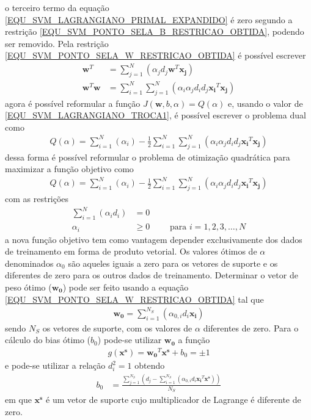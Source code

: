 o terceiro termo da equação \eqref{EQU_SVM_LAGRANGIANO_PRIMAL_EXPANDIDO} é zero segundo a restrição \eqref{EQU_SVM_PONTO_SELA_B_RESTRICAO_OBTIDA}, podendo ser removido. Pela restrição \eqref{EQU_SVM_PONTO_SELA_W_RESTRICAO_OBTIDA} é possível escrever
\begin{align}
\mathbf{w}^{T} &= \sum\limits_{j = 1}^{N} \left( \alpha_{j}d_{j}\mathbf{w}^{T}\mathbf{x_{j}} \right) \\
\mathbf{w}^{T}\mathbf{w} &= \sum\limits_{i=1}^{N} \sum\limits_{j=1}^{N} \left( \alpha_{i}\alpha_{j}d_{i}d_{j}\mathbf{x_{i}}^{T}\mathbf{x_{j}} \right) \label{EQU_SVM_LAGRANGIANO_TROCA1}
\end{align}
agora é possível reformular a função \(J(\mathbf{w}, b, \alpha) = Q(\alpha)\) e, usando o valor de \eqref{EQU_SVM_LAGRANGIANO_TROCA1}, é possível escrever o problema dual como
\begin{align}
Q(\alpha) = \sum\limits_{i=1}^{N} \left( \alpha_{i} \right) - \frac{1}{2} \sum\limits_{i=1}^{N} \sum\limits_{j=1}^{N} \left( \alpha_{i}\alpha_{j}d_{i}d_{j}\mathbf{x_{i}}^{T}\mathbf{x_{j}} \right) \label{EQU_SVM_LAGRANGIANO_DUAL}
\end{align}
dessa forma é possível reformular o problema de otimização quadrática para maximizar a função objetivo como
\begin{align}
Q(\alpha) = \sum\limits_{i=1}^{N} \left( \alpha_{i} \right) - \frac{1}{2} \sum\limits_{i=1}^{N} \sum\limits_{j=1}^{N} \left( \alpha_{i}\alpha_{j}d_{i}d_{j}\mathbf{x_{i}}^{T}\mathbf{x_{j}} \right) \label{EQU_SVM_OBJETIVO_DUAL}
\end{align}
com as restrições
\begin{align}
\sum\limits_{i=1}^{N} \left( \alpha_{i}d_{i} \right) &= 0 \\
\alpha_{i} &\geq 0	\qquad \textrm{ para } i = 1, 2, 3, \ldots, N
\end{align}
a nova função objetivo tem como vantagem depender exclusivamente dos dados de treinamento em forma de produto vetorial. Os valores ótimos de \(\alpha\) denominados \(\alpha_{0}\) são aqueles iguais a zero para os vetores de suporte e os diferentes de zero para os outros dados de treinamento. Determinar o vetor de peso ótimo (\(\mathbf{w_{0}}\)) pode ser feito usando a equação \eqref{EQU_SVM_PONTO_SELA_W_RESTRICAO_OBTIDA} tal que
\begin{align}
\mathbf{w_{0}} = \sum\limits_{i=1}^{N_{S}} \left( \alpha_{0,i}d_{i}\mathbf{x_{i}} \right) \label{EQU_SVM_W_OTIMO}
\end{align}
sendo \(N_{S}\) os vetores de suporte, com os valores de \(\alpha\) diferentes de zero. Para o cálculo do bias ótimo (\(b_{0}\)) pode-se utilizar \(\mathbf{w_{0}}\) a função
\begin{align}
g(\mathbf{x^{s}}) = \mathbf{w_{0}}^{T}\mathbf{x^{s}} + b_{0} = \pm 1
\end{align}
e pode-se utilizar a relação \(d_{i}^{2} = 1\) obtendo
\begin{align}
b_{0} &= \frac{\sum\limits_{j = 1}^{N_{S}} \left( d_{j} - \sum\limits_{i=1}^{N_{S}} \left( \alpha_{0,i}d_{i}\mathbf{x_{i}}^{T}\mathbf{x^{s}} \right) \right)}{N_{S}} 
\end{align}
em que \(\mathbf{x^{s}}\) é um vetor de suporte cujo multiplicador de Lagrange é diferente de zero. 

